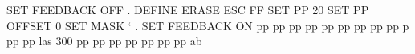SET FEEDBACK OFF                                                                
.                                                                               
DEFINE ERASE ESC FF                                                             
SET PP 20                                                                       
SET PP OFFSET 0                                                                 
SET MASK `                                                                      
.                                                                               
SET FEEDBACK ON                                                                 
pp                                                                              
pp                                                                              
pp                                                                              
pp                                                                              
pp                                                                              
pp                                                                              
pp                                                                              
pp                                                                              
pp                                                                              
p                                                                               
pp                                                                              
pp                                                                              
las                                                                             
300                                                                             
pp                                                                              
pp                                                                              
pp                                                                              
pp                                                                              
pp                                                                              
pp                                                                              
pp                                                                              
ab                                                                              
